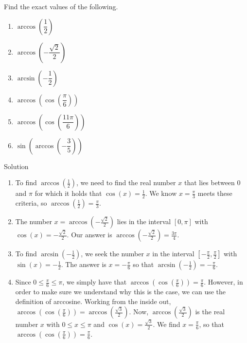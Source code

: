 \begin{example}  \label{arccosinesineex} 
	Find the exact values of the following.
	
	\begin{multicols}{2}
		
		\begin{enumerate}
			
			\item $\arccos\left(\dfrac{1}{2}\right)$
			\item  $\arccos\left(-\dfrac{\sqrt{2}}{2}\right)$
			\item  $\arcsin\left(-\dfrac{1}{2}\right)$
			\item  $\arccos\left( \cos\left(\dfrac{\pi}{6}\right)\right)$
			\item  $\arccos\left( \cos\left(\dfrac{11\pi}{6}\right)\right)$
			\item  $\sin\left(\arccos\left(-\dfrac{3}{5}\right)\right)$
		\end{enumerate}
		
	\end{multicols}
	
	Solution 
	
	\begin{enumerate}
		
		\item  To find $\arccos\left(\frac{1}{2}\right)$, we need to find the real number $x$ that lies between $0$ and $\pi$ for which it holds that $\cos(x) = \frac{1}{2}$. We know $x = \frac{\pi}{3}$ meets these criteria, so $\arccos\left(\frac{1}{2}\right)= \frac{\pi}{3}$.
		
		\item  The number $x = \arccos\left(-\frac{\sqrt{2}}{2}\right)$ lies in the interval $[0,\pi]$ with $\cos(x) = -\frac{\sqrt{2}}{2}$.  Our answer is $\arccos\left(-\frac{\sqrt{2}}{2}\right) = \frac{3\pi}{4}$.
		
		\item  To find  $\arcsin\left(-\frac{1}{2}\right)$, we seek the number $x$ in the interval $\left[-\frac{\pi}{2}, \frac{\pi}{2}\right]$ with $\sin(x) = -\frac{1}{2}$.  The answer is $x = -\frac{\pi}{6}$ so that $\arcsin\left(-\frac{1}{2}\right) = -\frac{\pi}{6}$.
		
		\item  Since $0 \leq \frac{\pi}{6} \leq \pi$, we simply have that $\arccos\left( \cos\left(\frac{\pi}{6}\right)\right) = \frac{\pi}{6}$.  However, in order to make sure we understand why this is the case, we can use the definition of arccosine.  Working from the inside out,  $\arccos\left( \cos\left(\frac{\pi}{6}\right)\right) = \arccos\left( \frac{\sqrt{3}}{2}\right)$.  Now, $\arccos\left( \frac{\sqrt{3}}{2}\right)$ is the real number $x$ with $0 \leq x \leq \pi$ and $\cos(x) = \frac{\sqrt{3}}{2}$.  We find $x = \frac{\pi}{6}$, so that  $\arccos\left( \cos\left(\frac{\pi}{6}\right)\right) = \frac{\pi}{6}$.
		

\end{enumerate}
\end{example}
